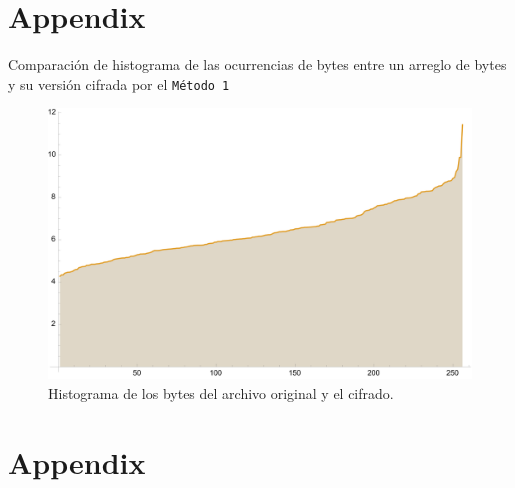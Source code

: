 \section{Appendix}

Comparación de histograma de las ocurrencias de bytes entre un arreglo de bytes
y su versión cifrada por el \texttt{Método 1}

\begin{figure}[H]
    \centering
    \includegraphics[scale=0.7]{../img/historygram}
    \caption*{Histograma de los bytes del archivo
original y el cifrado.}\label{fig:d2}
\end{figure}

\newpage
\section{Appendix}

